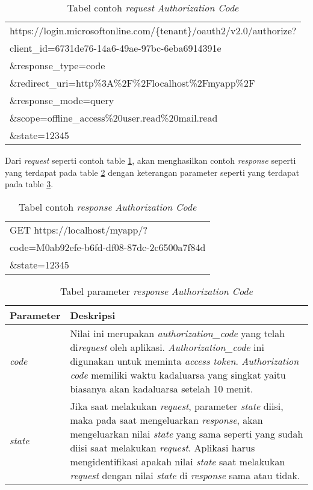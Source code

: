 \begin{table}[H]
	\centering 
	\caption{Tabel contoh \textit{request} \textit{Authorization Code}}
	\label{tab:contoh_request_authorization_code}
	\begin{tabular}{|p{12cm}|}
	\toprule
	https://login.microsoftonline.com/\{tenant\}/oauth2/v2.0/authorize?\\
client\_id=6731de76-14a6-49ae-97bc-6eba6914391e\\
\&response\_type=code\\
\&redirect\_uri=http\%3A\%2F\%2Flocalhost\%2Fmyapp\%2F\\
\&response\_mode=query\\
\&scope=offline\_access\%20user.read\%20mail.read\\
\&state=12345\\
	\bottomrule
\end{tabular}  
\end{table}

Dari \textit{request} seperti contoh table \ref{tab:contoh_request_authorization_code}, akan menghasilkan contoh \textit{response} seperti yang terdapat pada table \ref{tab:contoh_response_authorization_code} dengan keterangan parameter seperti yang terdapat pada table \ref{tab:parameter_response_authorization_code}. 

\begin{table}[H]
	\centering 
	\caption{Tabel contoh \textit{response} \textit{Authorization Code}}
	\label{tab:contoh_response_authorization_code}
	\begin{tabular}{|p{9cm}|}
	\toprule
	GET https://localhost/myapp/?\\
code=M0ab92efe-b6fd-df08-87dc-2c6500a7f84d\\
\&state=12345 \\
	\bottomrule
\end{tabular}  
\end{table}

\begin{table}[H]
	\centering 
	\caption{Tabel parameter \textit{response} \textit{Authorization Code}}
	\label{tab:parameter_response_authorization_code}
	\begin{tabular}{|p{3cm}|p{9cm}|}
	\toprule
	\textbf{Parameter} & \textbf{Deskripsi}\\ \hline 
	\textit{code} & Nilai ini merupakan \textit{authorization\_code} yang telah di\textit{request} oleh aplikasi. \textit{Authorization\_code} ini digunakan untuk meminta \textit{access token}. \textit{Authorization code} memiliki waktu kadaluarsa yang singkat yaitu biasanya akan kadaluarsa setelah 10 menit. \\ \hline 
	\textit{state} & Jika saat melakukan \textit{request}, parameter \textit{state} diisi, maka pada saat mengeluarkan \textit{response}, akan mengeluarkan nilai \textit{state} yang sama seperti yang sudah diisi saat melakukan \textit{request}. Aplikasi harus mengidentifikasi apakah nilai \textit{state} saat melakukan \textit{request} dengan nilai \textit{state} di \textit{response} sama atau tidak. \\ \bottomrule
\end{tabular}  
\end{table}


